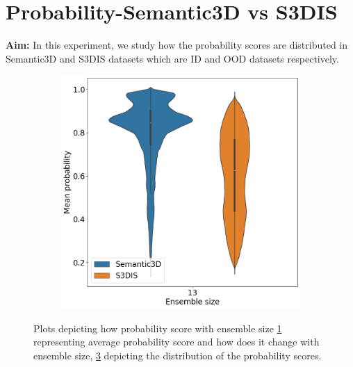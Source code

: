     \section{Probability-Semantic3D vs S3DIS}
    \label{sec:prob_sem3dvs3dis}
    \textbf{Aim: } In this experiment, we study how the probability scores are distributed in Semantic3D and S3DIS datasets which are ID and OOD datasets respectively.
    \begin{figure}[h!]
        \begin{subfigure}{0.54\textwidth}
            
            \caption{}
            \label{fig:prob_sem3dvs3dis}    
        \end{subfigure}
        \begin{subfigure}{0.45\textwidth}
            \includegraphics[scale=0.33]{images/violin_in_Max_predicted_probability.png}
            \caption{}
            \label{fig:13_sem3dvs3dis}
        \end{subfigure}
        \caption{Plots depicting how probability score with ensemble size \ref{fig:prob_sem3dvs3dis} representing average probability score and how does it change with ensemble size, \ref{fig:13_sem3dvs3dis} depicting the distribution of the probability scores.}
    \end{figure}

